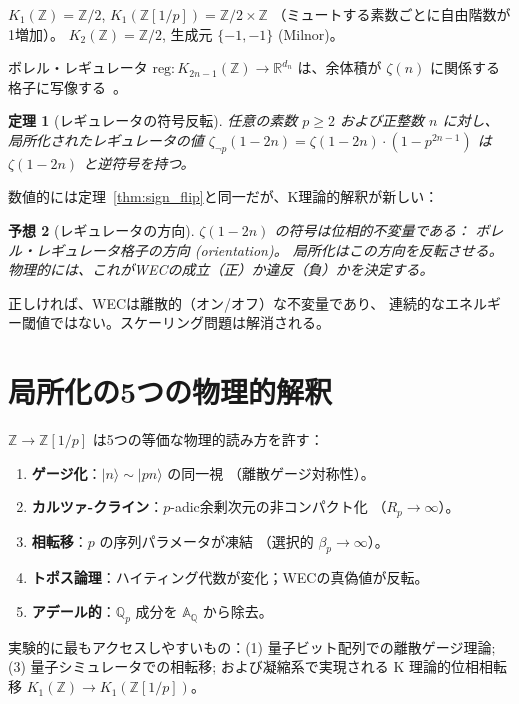 \documentclass[11pt,a4paper]{article}
\newtheorem{theorem}{定理}[section]
\newtheorem{conjecture}[theorem]{予想}
\newcommand{\Zp}{\mathbb{Z}[1/p]}
\newcommand{\Qp}{\mathbb{Q}_p}
\begin{document}
$K_1(\mathbb{Z}) = \mathbb{Z}/2$, $K_1(\Zp) = \mathbb{Z}/2 \times \mathbb{Z}$
（ミュートする素数ごとに自由階数が1増加）。
$K_2(\mathbb{Z}) = \mathbb{Z}/2$, 生成元 $\{-1,-1\}$ (Milnor)。

ボレル・レギュレータ $\mathrm{reg}: K_{2n-1}(\mathbb{Z}) \to \mathbb{R}^{d_n}$
は、余体積が $\zeta(n)$ に関係する格子に写像する~\cite{Borel1977,Lichtenbaum1973}。

\begin{theorem}[レギュレータの符号反転]
任意の素数 $p \geq 2$ および正整数 $n$ に対し、
局所化されたレギュレータの値
$\zeta_{\neg p}(1-2n) = \zeta(1-2n)\cdot(1-p^{2n-1})$
は $\zeta(1-2n)$ と逆符号を持つ。
\end{theorem}

数値的には定理~\ref{thm:sign_flip}と同一だが、K理論的解釈が新しい：

\begin{conjecture}[レギュレータの方向]
\label{conj:reg}
$\zeta(1-2n)$ の符号は位相的不変量である：
ボレル・レギュレータ格子の\emph{方向 (orientation)}。
局所化はこの方向を反転させる。
物理的には、これがWECの成立（正）か違反（負）かを決定する。
\end{conjecture}

正しければ、WECは離散的（オン/オフ）な不変量であり、
連続的なエネルギー閾値ではない。スケーリング問題は解消される。

\section{局所化の5つの物理的解釈}

$\mathbb{Z} \to \Zp$ は5つの等価な物理的読み方を許す：

\begin{enumerate}
\item \textbf{ゲージ化}：$|n\rangle \sim |pn\rangle$ の同一視
  （離散ゲージ対称性）。
\item \textbf{カルツァ-クライン}：$p$-adic余剰次元の非コンパクト化
  （$R_p \to \infty$）。
\item \textbf{相転移}：$p$ の序列パラメータが凍結
  （選択的 $\beta_p \to \infty$）。
\item \textbf{トポス論理}：ハイティング代数が変化；WECの真偽値が反転。
\item \textbf{アデール的}：$\Qp$ 成分を $\mathbb{A}_\mathbb{Q}$ から除去。
\end{enumerate}

実験的に最もアクセスしやすいもの：(1) 量子ビット配列での離散ゲージ理論;
(3) 量子シミュレータでの相転移;
および凝縮系で実現される K 理論的位相相転移
$K_1(\mathbb{Z}) \to K_1(\Zp)$。
\end{document}
